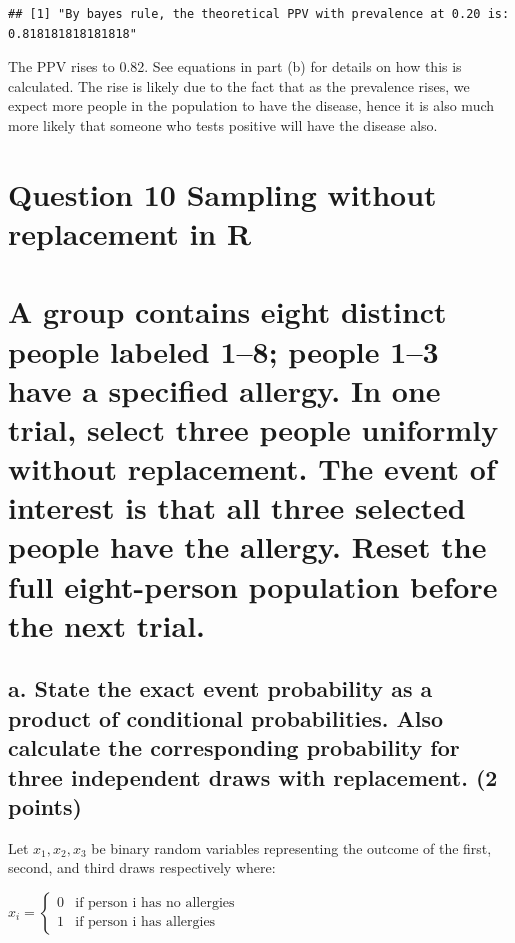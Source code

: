 \documentclass[
]{article}
\begin{document}
\begin{verbatim}
## [1] "By bayes rule, the theoretical PPV with prevalence at 0.20 is: 0.818181818181818"
\end{verbatim}

The PPV rises to 0.82. See equations in part (b) for details on how this
is calculated. The rise is likely due to the fact that as the prevalence
rises, we expect more people in the population to have the disease,
hence it is also much more likely that someone who tests positive will
have the disease also.

\section{Question 10 Sampling without replacement in
R}\label{question-10-sampling-without-replacement-in-r}

\section{A group contains eight distinct people labeled 1--8; people
1--3 have a specified allergy. In one trial, select three people
uniformly without replacement. The event of interest is that all three
selected people have the allergy. Reset the full eight-person population
before the next
trial.}\label{a-group-contains-eight-distinct-people-labeled-18-people-13-have-a-specified-allergy.-in-one-trial-select-three-people-uniformly-without-replacement.-the-event-of-interest-is-that-all-three-selected-people-have-the-allergy.-reset-the-full-eight-person-population-before-the-next-trial.}

\subsection{a. State the exact event probability as a product of
conditional probabilities. Also calculate the corresponding probability
for three independent draws with replacement. (2
points)}\label{a.-state-the-exact-event-probability-as-a-product-of-conditional-probabilities.-also-calculate-the-corresponding-probability-for-three-independent-draws-with-replacement.-2-points}

Let \(x_1, x_2, x_3\) be binary random variables representing the
outcome of the first, second, and third draws respectively where:

\(x_i = \begin{cases} 0& \text{if person i has no allergies}  \\ 1 & \text{if person i has allergies} \end{cases}\)
\end{document}

